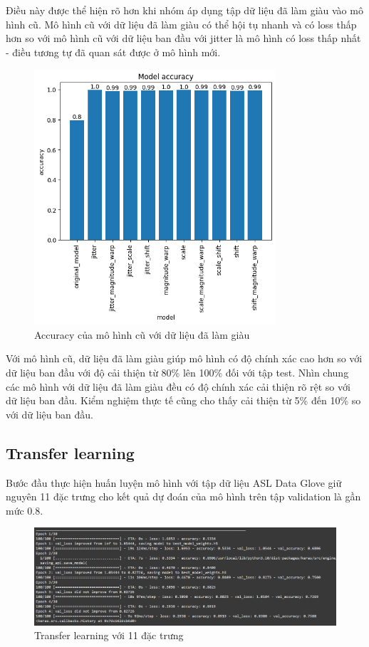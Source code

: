 Điều này được thể hiện rõ hơn khi nhóm áp dụng tập dữ liệu đã làm giàu vào mô hình cũ. Mô hình cũ với dữ liệu đã làm giàu có thể hội tụ nhanh và có loss thấp hơn so với mô hình cũ với dữ liệu ban đầu với jitter là mô hình có loss thấp nhất - điều tương tự đã quan sát được ở mô hình mới.

\begin{figure}[H]
    \centering
    \includegraphics[width=0.8\textwidth]{Images/Improvement results/old_data_augmentation_accuracy.png}
    \caption{Accuracy của mô hình cũ với dữ liệu đã làm giàu}
    \label{fig:old_data_augmentation_accuracy}
\end{figure}

Với mô hình cũ, dữ liệu đã làm giàu giúp mô hình có độ chính xác cao hơn so với dữ liệu ban đầu với độ cải thiện từ 80\% lên 100\% đối với tập test. Nhìn chung các mô hình với dữ liệu đã làm giàu đều có độ chính xác cải thiện rõ rệt so với dữ liệu ban đầu. Kiểm nghiệm thực tế cũng cho thấy cải thiện từ 5\% đến 10\% so với dữ liệu ban đầu.

\subsection{Transfer learning}
Bước đầu thực hiện huấn luyện mô hình với tập dữ liệu ASL Data Glove giữ nguyên 11 đặc trưng cho kết quả dự đoán của mô hình trên tập validation là gần mức 0.8. 

\begin{figure}[H]
    \centering
    \includegraphics[width=1.1\textwidth]{Images/Improvement results/transfer_learning_training_result_full_class.png}
    \caption{Transfer learning với 11 đặc trưng}
    \label{fig:transfer_learning_training_result_full_class}
\end{figure}


